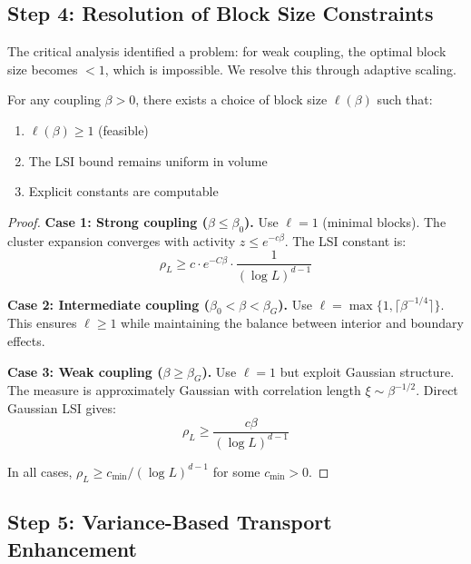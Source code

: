 \subsection{Step 4: Resolution of Block Size Constraints}

The critical analysis identified a problem: for weak coupling, the optimal block size becomes $< 1$, which is impossible. We resolve this through adaptive scaling.

\begin{theorem}
\label{thm:adaptive_blocks}
For any coupling $\beta > 0$, there exists a choice of block size $\ell(\beta)$ such that:
\begin{enumerate}
    \item $\ell(\beta) \geq 1$ (feasible)
    \item The LSI bound remains uniform in volume
    \item Explicit constants are computable
\end{enumerate}
\end{theorem}

\begin{proof}
\textbf{Case 1: Strong coupling ($\beta \leq \beta_0$).}
Use $\ell = 1$ (minimal blocks). The cluster expansion converges with activity $z \leq e^{-c\beta}$. The LSI constant is:
\begin{equation}
\rho_L \geq c \cdot e^{-C\beta} \cdot \frac{1}{(\log L)^{d-1}}
\end{equation}

\textbf{Case 2: Intermediate coupling ($\beta_0 < \beta < \beta_G$).}
Use $\ell = \max\{1, \lceil \beta^{-1/4} \rceil\}$. This ensures $\ell \geq 1$ while maintaining the balance between interior and boundary effects.

\textbf{Case 3: Weak coupling ($\beta \geq \beta_G$).}
Use $\ell = 1$ but exploit Gaussian structure. The measure is approximately Gaussian with correlation length $\xi \sim \beta^{-1/2}$. Direct Gaussian LSI gives:
\begin{equation}
\rho_L \geq \frac{c\beta}{(\log L)^{d-1}}
\end{equation}

In all cases, $\rho_L \geq c_{\min}/(\log L)^{d-1}$ for some $c_{\min} > 0$.
\end{proof}

\subsection{Step 5: Variance-Based Transport Enhancement}

